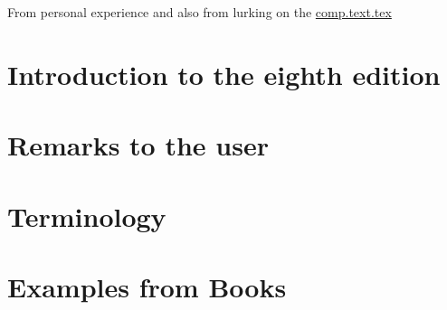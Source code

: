 \documentclass[10pt,a4paper,extrafontsizes]{memoir}
\newcommand{\PWnote}[2]{}
\newcommand\svnidlong[4]{}
\begin{document}
    From personal experience and also from lurking on the \url{comp.text.tex}



\svnidlong
{$Ignore: $}
{$LastChangedDate: 2010-05-13 17:10:00 +0200 (Thu, 13 May 2010) $}
{$LastChangedRevision: 210 $}
{$LastChangedBy: daleif $}

\chapter{Introduction to the eighth edition}


\PWnote{2009/07/26}{Added `Remarks to the user' chapter}
\chapter{Remarks to the user}



\svnidlong
{$Ignore: $}
{$LastChangedDate: 2010-05-13 17:10:00 +0200 (Thu, 13 May 2010) $}
{$LastChangedRevision: 210 $}
{$LastChangedBy: daleif $}

\chapter{Terminology}



\cleardoublepage
{}

\mainmatter





\svnidlong
{$Ignore: $}
{$LastChangedDate: 2010-07-15 22:37:02 +0200 (Thu, 15 Jul 2010) $}
{$LastChangedRevision: 256 $}
{$LastChangedBy: daleif $}


\chapter{Examples from Books} %
\label{chap:examples_from_books}
\end{document}
